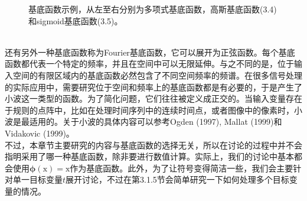 \documentclass[b5paper]{book}
\numberwithin{equation}{chapter}
\newcommand {\bx} {\boldsymbol{\mathrm{x}}}
\newcommand {\bfphi} {\boldsymbol{\phi}}
\begin{document}
{\begin{figure}[ht]
\begin{minipage}[t]{0.3\linewidth}
		\end{minipage}
		\caption{基底函数示例，从左至右分别为多项式基底函数，高斯基底函数(3.4)和sigmoid基底函数(3.5)。}
	\end{figure}
	\\
	\indent 还有另外一种基底函数称为Fourier基底函数，它可以展开为正弦函数。每个基底函数都代表一个特定的频率，并且在空间中可以无限延伸。与之不同的是，位于输入空间的有限区域内的基底函数必然包含了不同空间频率的频谱。在很多信号处理的实际应用中，需要研究位于空间和频率上的基底函数都是有必要的，于是产生了小波这一类型的函数。为了简化问题，它们往往被定义成正交的。当输入变量存在于规则的点阵中，比如在处理时间序列中的连续时间点，或者图像中的像素时，小波是最适用的。关于小波的具体内容可以参考Ogden (1997), Mallat (1999)和Vidakovic (1999)。\\
	\indent 不过，本章节主要研究的内容与基底函数的选择无关，所以在讨论的过程中并不会指明采用了哪一种基底函数，除非要进行数值计算。实际上，我们的讨论中基本都会使用$\bfphi(\bx)=\bx$作为基底函数。此外，为了让符号变得简洁一些，我们会主要针对单一目标变量$t$展开讨论，不过在第3.1.5节会简单研究一下如何处理多个目标变量的情况。
	}
\end{document}
